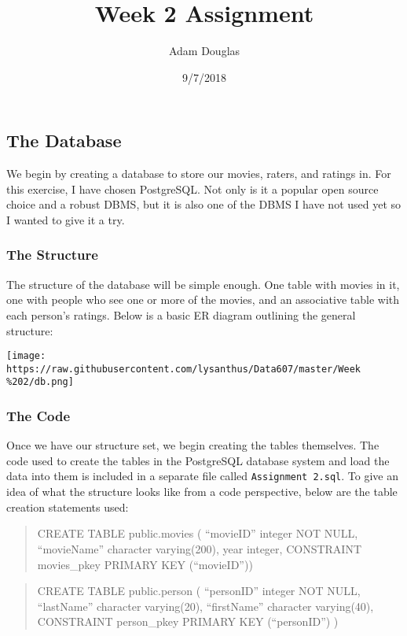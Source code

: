 \documentclass[]{article}
\title{Week 2 Assignment}
\author{Adam Douglas}
\date{9/7/2018}
\begin{document}
\maketitle

\subsection{The Database}\label{the-database}

We begin by creating a database to store our movies, raters, and ratings
in. For this exercise, I have chosen PostgreSQL. Not only is it a
popular open source choice and a robust DBMS, but it is also one of the
DBMS I have not used yet so I wanted to give it a try.

\subsubsection{The Structure}\label{the-structure}

The structure of the database will be simple enough. One table with
movies in it, one with people who see one or more of the movies, and an
associative table with each person's ratings. Below is a basic ER
diagram outlining the general structure:

\texttt{[image: https://raw.githubusercontent.com/lysanthus/Data607/master/Week\\\%202/db.png]}

\subsubsection{The Code}\label{the-code}

Once we have our structure set, we begin creating the tables themselves.
The code used to create the tables in the PostgreSQL database system and
load the data into them is included in a separate file called
\texttt{Assignment\ 2.sql}. To give an idea of what the structure looks
like from a code perspective, below are the table creation statements
used:

\begin{quote}
CREATE TABLE public.movies ( ``movieID'' integer NOT NULL, ``movieName''
character varying(200), year integer, CONSTRAINT movies\_pkey PRIMARY
KEY (``movieID''))
\end{quote}

\begin{quote}
CREATE TABLE public.person ( ``personID'' integer NOT NULL, ``lastName''
character varying(20), ``firstName'' character varying(40), CONSTRAINT
person\_pkey PRIMARY KEY (``personID'') )
\end{quote}
\end{document}
